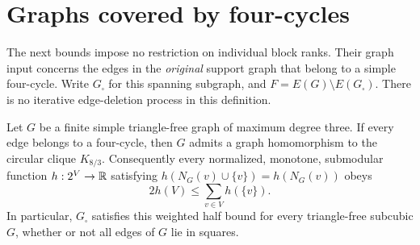 \section{Graphs covered by four-cycles}\label{sec:squares}
The next bounds impose no restriction on individual block ranks. Their
graph input concerns the edges in the \emph{original} support graph that
belong to a simple four-cycle. Write $G_\square$ for this spanning
subgraph, and $F=E(G)\setminus E(G_\square)$. There is no iterative
edge-deletion process in this definition.

\begin{theorem}\label{thm:square-good}
Let $G$ be a finite simple triangle-free graph of maximum degree three.
If every edge belongs to a four-cycle, then $G$ admits a graph
homomorphism to the circular clique $K_{8/3}$. Consequently every
normalized, monotone, submodular function $h:2^V\to\mathbb{R}$ satisfying
$h(N_G(v)\cup\{v\})=h(N_G(v))$ obeys
\[
 2h(V)\leq\sum_{v\in V}h(\{v\}).
\]
In particular, $G_\square$ satisfies this weighted half bound for every
triangle-free subcubic $G$, whether or not all edges of $G$ lie in squares.
\end{theorem}
